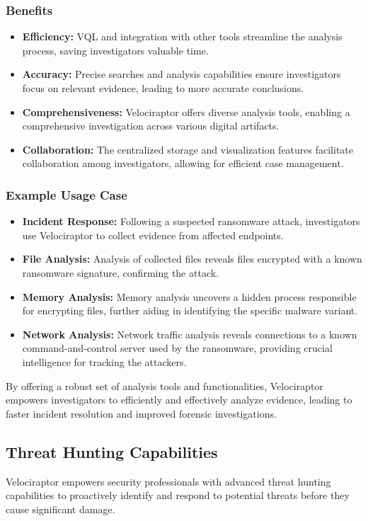 \documentclass[a4paper, 11pt, oneside]{article} %
\begin{document}
\subsubsection{Benefits}
\begin{itemize}
    \item \textbf{Efficiency: } VQL and integration with other tools streamline the analysis process, saving investigators valuable time.
    \item \textbf{Accuracy: }Precise searches and analysis capabilities ensure investigators focus on relevant evidence, leading to more accurate conclusions.
    \item \textbf{Comprehensiveness: }Velociraptor offers diverse analysis tools, enabling a comprehensive investigation across various digital artifacts.
    \item \textbf{Collaboration: }The centralized storage and visualization features facilitate collaboration among investigators, allowing for efficient case management.
\end{itemize}
\subsubsection{Example Usage Case}
\begin{itemize}
    \item \textbf{Incident Response: }Following a suspected ransomware attack, investigators use Velociraptor to collect evidence from affected endpoints.
    \item \textbf{File Analysis: } Analysis of collected files reveals files encrypted with a known ransomware signature, confirming the attack.
    \item \textbf{Memory Analysis: } Memory analysis uncovers a hidden process responsible for encrypting files, further aiding in identifying the specific malware variant.
    \item \textbf{Network Analysis: }Network traffic analysis reveals connections to a known command-and-control server used by the ransomware, providing crucial intelligence for tracking the attackers.
\end{itemize}
By offering a robust set of analysis tools and functionalities, Velociraptor empowers investigators to efficiently and effectively analyze evidence, leading to faster incident resolution and improved forensic investigations.
\subsection{Threat Hunting Capabilities}
Velociraptor empowers security professionals with advanced threat hunting capabilities to proactively identify and respond to potential threats before they cause significant damage.
\end{document}
